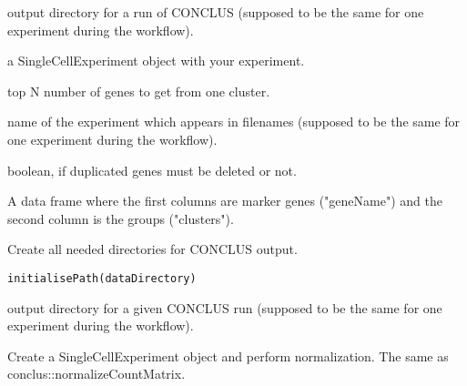 \documentclass[a4paper]{book}
\begin{document}
\begin{Arguments}
\begin{ldescription}
\item[\code{dataDirectory}] output directory for a run of CONCLUS (supposed to be the same for one experiment during the workflow).

\item[\code{sceObject}] a SingleCellExperiment object with your experiment.

\item[\code{genesNumber}] top N number of genes to get from one cluster.

\item[\code{experimentName}] name of the experiment which appears in filenames (supposed to be the same for one experiment during the workflow).

\item[\code{removeDuplicates}] boolean, if duplicated genes must be deleted or not.
\end{ldescription}
\end{Arguments}
%
\begin{Value}
A data frame where the first columns are marker genes ("geneName") and 
the second column is the groups ("clusters").
\end{Value}
%
\begin{Description}\relax
Create all needed directories for CONCLUS output.
\end{Description}
%
\begin{Usage}
\begin{verbatim}
initialisePath(dataDirectory)
\end{verbatim}
\end{Usage}
%
\begin{Arguments}
\begin{ldescription}
\item[\code{dataDirectory}] output directory for a given CONCLUS run (supposed to be the same for one experiment during the workflow).
\end{ldescription}
\end{Arguments}
%
\begin{Description}\relax
Create a SingleCellExperiment object and perform normalization. The same as conclus::normalizeCountMatrix.
\end{Description}
\end{document}
